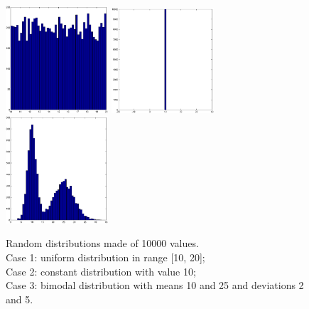 \begin{center}
\begin{figure}[h]
\centering
\includegraphics[width=1.5in]{uniform}
\includegraphics[width=1.5in]{constant}
\includegraphics[width=1.5in]{bimodal}
\caption{Random distributions made of 10000 values.\\ Case 1: uniform distribution in range [10, 20];\\ Case 2: constant distribution with value 10;\\ Case 3: bimodal distribution with means 10 and 25 and deviations 2 and 5.}
\end{figure}
\end{center}

